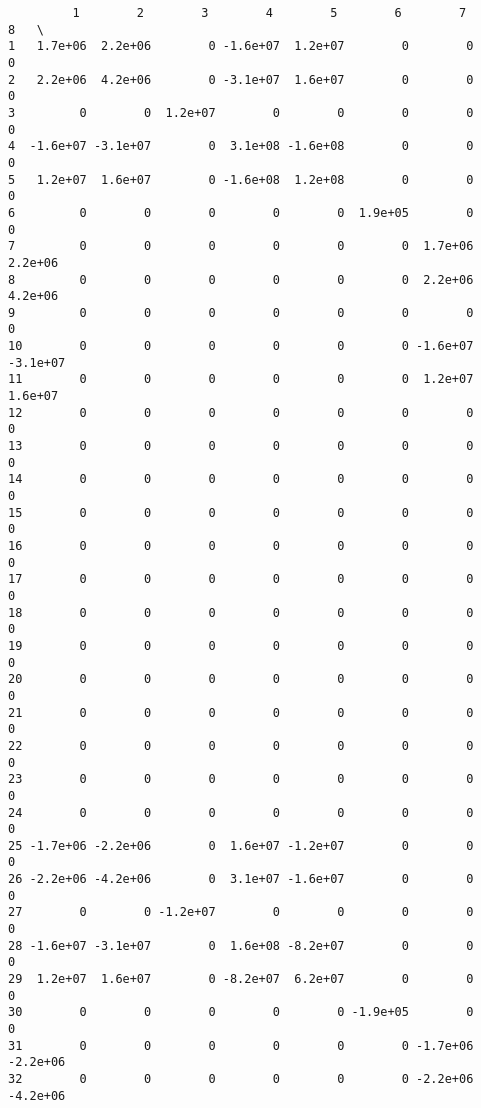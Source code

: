 \documentclass{article}
\begin{document}
    
    \begin{verbatim}
         1        2        3        4        5        6        7        8   \
1   1.7e+06  2.2e+06        0 -1.6e+07  1.2e+07        0        0        0   
2   2.2e+06  4.2e+06        0 -3.1e+07  1.6e+07        0        0        0   
3         0        0  1.2e+07        0        0        0        0        0   
4  -1.6e+07 -3.1e+07        0  3.1e+08 -1.6e+08        0        0        0   
5   1.2e+07  1.6e+07        0 -1.6e+08  1.2e+08        0        0        0   
6         0        0        0        0        0  1.9e+05        0        0   
7         0        0        0        0        0        0  1.7e+06  2.2e+06   
8         0        0        0        0        0        0  2.2e+06  4.2e+06   
9         0        0        0        0        0        0        0        0   
10        0        0        0        0        0        0 -1.6e+07 -3.1e+07   
11        0        0        0        0        0        0  1.2e+07  1.6e+07   
12        0        0        0        0        0        0        0        0   
13        0        0        0        0        0        0        0        0   
14        0        0        0        0        0        0        0        0   
15        0        0        0        0        0        0        0        0   
16        0        0        0        0        0        0        0        0   
17        0        0        0        0        0        0        0        0   
18        0        0        0        0        0        0        0        0   
19        0        0        0        0        0        0        0        0   
20        0        0        0        0        0        0        0        0   
21        0        0        0        0        0        0        0        0   
22        0        0        0        0        0        0        0        0   
23        0        0        0        0        0        0        0        0   
24        0        0        0        0        0        0        0        0   
25 -1.7e+06 -2.2e+06        0  1.6e+07 -1.2e+07        0        0        0   
26 -2.2e+06 -4.2e+06        0  3.1e+07 -1.6e+07        0        0        0   
27        0        0 -1.2e+07        0        0        0        0        0   
28 -1.6e+07 -3.1e+07        0  1.6e+08 -8.2e+07        0        0        0   
29  1.2e+07  1.6e+07        0 -8.2e+07  6.2e+07        0        0        0   
30        0        0        0        0        0 -1.9e+05        0        0   
31        0        0        0        0        0        0 -1.7e+06 -2.2e+06   
32        0        0        0        0        0        0 -2.2e+06 -4.2e+06   

\end{verbatim}
\end{document}
